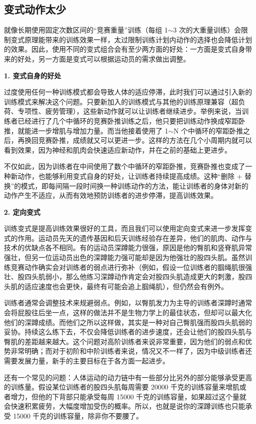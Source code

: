 \documentclass[fontset=fandol, a4paper, 12pt, openright]{ctexbook}
\begin{document}
\subsection{变式动作太少}

就像长期使用固定次数区间的“竞赛重量”训练（每组 1$\sim$3 次的大重量训练）会限制变式原理能带来的训练效果一样，太过限制训练计划内动作的选择也会降低计划的效果。因此，使用不同的变式组合会有至少两方面的好处：一方面是变式自身带来的好处，另一方面是变式可以根据运动员的需求做出调整。

\textbf{1. 变式自身的好处}

过度使用任何一种训练模式都会导致人体的适应停滞，此时我们可以通过引入新的训练模式来解决这个问题。只要新加入的训练模式与其他的训练原理兼容（超负荷、专项性、疲劳管理），这些新动作就可以让训练者继续进步。举例来说，当训练者已经进行了几个中循环的竞赛卧推训练之后，他只要把训练动作换成窄距卧推，就能进一步增肌与增加力量。而当他接着使用了 1$\sim$N 个中循环的窄距卧推之后，再换回竞赛卧推，成绩就又可以更进一步。这样的方法在几个小周期内就可以看到效果，因为神经和肌肉会快速适应新动作，并在之前的基础上更进步。

不仅如此，因为训练者在中间使用了数个中循环的窄距卧推，竞赛卧推也变成了一种新动作，也能够利用变式自身的好处，让训练者持续提高成绩。这种“删除 + 替换”的模式，即每间隔一段时间换一种训练动作的方法，能让训练者的身体对新的动作产生不适应，从而有效地预防训练者的进步停滞，提高训练效果。

\textbf{2. 定向变式}

训练变式是提高训练效果很好的工具，而且我们可以使用定向变式来进一步发挥变式的作用。运动员先天的遗传基因和后天训练经验存在差异，他们的肌肉、动作与技术的优缺点各不相同。有的运动员深蹲能力很强，原因是他的臀肌和竖脊肌异常强壮，但另一位运动员出色的深蹲能力强可能却是因为他强壮的股四头肌。虽然训练竞赛动作确实会对训练者的弱点进行弥补（例如，假设一位训练者的腘绳肌很强壮、股四头肌弱小，那么他练习深蹲动作肯定会对股四头肌造成更大的刺激，股四头肌的适应速度也会更快，最终有可能会追上腘绳肌），但仍然会有例外。

训练者通常会调整技术来规避弱点。例如，以臀肌发力为主导的训练者深蹲时通常会将屁股往后坐一点，这样的做法并不是生物力学上的最佳状态，但却可以最大化他们的深蹲成绩。而他们之所以这样做，其实是一种对自己臀肌强而股四头肌弱的妥协。持续这么练下去，不仅会降低训练者的进步速度，还会让他们的股四头肌与臀肌的差距越来越大。这个问题对高阶训练者来说非常重要，因为他们的弱点和优势非常明确；而对于初阶和中阶训练者来说，情况又不一样了，因为中级训练者还需要发展力量，新手的主要目标在于各方面一起进步。

还有一个常见的问题：人体运动的动力链中有一些部分比另外的部分能够承受更高的训练量。假设某位训练者的股四头肌每周需要 20000 千克的训练容量来增肌或者增力，但他的下背部只能承受每周 15000 千克的训练容量，如果超过这个量就会快速积累疲劳，大幅度增加受伤的概率。所以，也就是说你的深蹲训练也只能承受 15000 千克的训练容量，除非你不要腰了。
\end{document}
